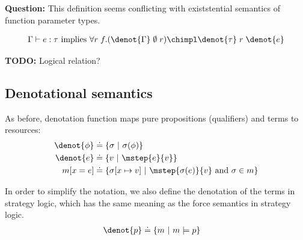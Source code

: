 \textbf{Question:} This definition seems conflicting with existstential semantics of function parameter types.


\begin{theorem}
\begin{align*}
  \Gamma \vdash e : \tau \text{ implies } \forall r\;f. (\denot{\Gamma}\;\emptyset\;r) \chimpl \denot{\tau}\;r\;\denot{e}
\end{align*}\noindent
\end{theorem}

\textbf{TODO:} Logical relation?

\subsection{Denotational semantics}

\begin{definition} As before, denotation function maps pure propositions (qualifiers) and terms to resources:
\begin{align*}
  \denot{\phi} &\doteq \{ \sigma ~|~ \sigma(\phi) \}
  \\
  \denot{e} &\doteq \{ v ~|~ \mstep{e}{v} \} \\
  m[x = e] &\doteq \{ \sigma[x \mapsto v] ~|~ \mstep{\sigma(e)}{v} \text{ and } \sigma \in m \}
\end{align*}
\end{definition}

\begin{definition} In order to simplify the notation, we also define the denotation of the terms in strategy logic, which has the same meaning as the force semantics in strategy logic.
  \begin{align*}
    \denot{p} &\doteq \{ m ~|~ m \models p \}
  \end{align*}
  \end{definition}

